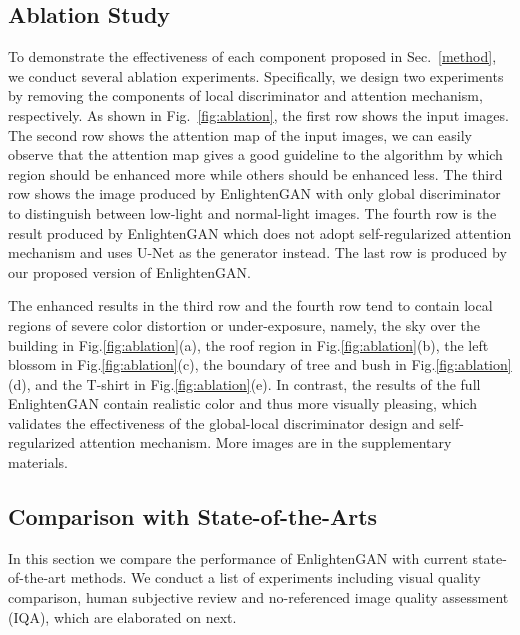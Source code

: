 \documentclass[journal]{IEEEtran}
\begin{document}
\subsection{Ablation Study} 

To demonstrate the effectiveness of each component proposed in Sec.~\ref{method}, we conduct several ablation experiments. 
Specifically, we design two experiments by removing the components of local discriminator and attention mechanism, respectively. 
As shown in Fig.~\ref{fig:ablation}, the first row shows the input images. The second row shows the attention map of the input images, we can easily observe that the attention map gives a good guideline to the algorithm by which region should be enhanced more while others should be enhanced less. The third row shows the image produced by EnlightenGAN with only global discriminator to distinguish between low-light and normal-light images. The fourth row is the result produced by EnlightenGAN which does not adopt self-regularized attention mechanism and uses U-Net as the generator instead. The last row is produced by our proposed version of EnlightenGAN. 






The enhanced results in the third row and the fourth row tend to contain local regions of severe color distortion or under-exposure, namely, the sky over the building in Fig.\ref{fig:ablation}(a), the roof region in  Fig.\ref{fig:ablation}(b), the left blossom in Fig.\ref{fig:ablation}(c), the boundary of tree and bush in Fig.\ref{fig:ablation}(d), and the T-shirt in Fig.\ref{fig:ablation}(e). 
In contrast, the results of the full EnlightenGAN contain realistic color and thus more visually pleasing, which validates the effectiveness of the global-local discriminator design and self-regularized attention mechanism. More images are in the supplementary materials.




\subsection{Comparison with State-of-the-Arts}

In this section we compare the performance of EnlightenGAN with current state-of-the-art methods. We conduct a list of experiments including visual quality comparison, human subjective review and no-referenced image quality assessment (IQA), which are elaborated on next. 
\end{document}
